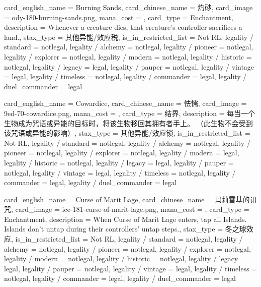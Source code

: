 \documentclass[lang = cn, color = black, 10pt]{AllThatStax}
\begin{document}
\card
{
	card_english_name = {Burning Sands},
	card_chinese_name = {灼砂},
	card_image = ody-180-burning-sands.png,
	mana_cost = ,
	card_type = Enchantment,
	description = {Whenever a creature dies, that creature's controller sacrifices a land.},
	stax_type = 其他异能/效应税,
	is_in_restricted_list = Not RL,
	legality / standard = notlegal,
	legality / alchemy = notlegal,
	legality / pioneer = notlegal,
	legality / explorer = notlegal,
	legality / modern = notlegal,
	legality / historic = notlegal,
	legality / legacy = legal,
	legality / pauper = notlegal,
	legality / vintage = legal,
	legality / timeless = notlegal,
	legality / commander = legal,
	legality / duel_commander = legal
}

\card
{
	card_english_name = {Cowardice},
	card_chinese_name = {怯懦},
	card_image = 9ed-70-cowardice.png,
	mana_cost = ,
	card_type = 结界,
	description = {每当一个生物成为咒语或异能的目标时，将该生物移回其拥有者手上。 （此生物不会受到该咒语或异能的影响）},
	stax_type = 其他异能/效应锁,
	is_in_restricted_list = Not RL,
	legality / standard = notlegal,
	legality / alchemy = notlegal,
	legality / pioneer = notlegal,
	legality / explorer = notlegal,
	legality / modern = legal,
	legality / historic = notlegal,
	legality / legacy = legal,
	legality / pauper = notlegal,
	legality / vintage = legal,
	legality / timeless = notlegal,
	legality / commander = legal,
	legality / duel_commander = legal
}

\card
{
	card_english_name = {Curse of Marit Lage},
	card_chinese_name = {玛莉雷基的诅咒},
	card_image = ice-181-curse-of-marit-lage.png,
	mana_cost = ,
	card_type = Enchantment,
	description = {When Curse of Marit Lage enters, tap all Islands.\\
		Islands don't untap during their controllers' untap steps.},
	stax_type = 冬之球效应,
	is_in_restricted_list = Not RL,
	legality / standard = notlegal,
	legality / alchemy = notlegal,
	legality / pioneer = notlegal,
	legality / explorer = notlegal,
	legality / modern = notlegal,
	legality / historic = notlegal,
	legality / legacy = legal,
	legality / pauper = notlegal,
	legality / vintage = legal,
	legality / timeless = notlegal,
	legality / commander = legal,
	legality / duel_commander = legal
}
\end{document}
